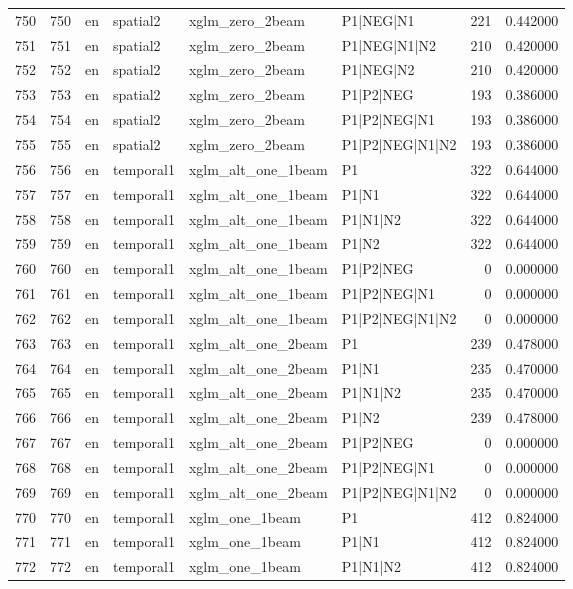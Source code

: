 \begin{tabular}{lrllllrr}
750 & 750 & en & spatial2 & xglm_zero_2beam & P1|NEG|N1 & 221 & 0.442000 \\
751 & 751 & en & spatial2 & xglm_zero_2beam & P1|NEG|N1|N2 & 210 & 0.420000 \\
752 & 752 & en & spatial2 & xglm_zero_2beam & P1|NEG|N2 & 210 & 0.420000 \\
753 & 753 & en & spatial2 & xglm_zero_2beam & P1|P2|NEG & 193 & 0.386000 \\
754 & 754 & en & spatial2 & xglm_zero_2beam & P1|P2|NEG|N1 & 193 & 0.386000 \\
755 & 755 & en & spatial2 & xglm_zero_2beam & P1|P2|NEG|N1|N2 & 193 & 0.386000 \\
756 & 756 & en & temporal1 & xglm_alt_one_1beam & P1 & 322 & 0.644000 \\
757 & 757 & en & temporal1 & xglm_alt_one_1beam & P1|N1 & 322 & 0.644000 \\
758 & 758 & en & temporal1 & xglm_alt_one_1beam & P1|N1|N2 & 322 & 0.644000 \\
759 & 759 & en & temporal1 & xglm_alt_one_1beam & P1|N2 & 322 & 0.644000 \\
760 & 760 & en & temporal1 & xglm_alt_one_1beam & P1|P2|NEG & 0 & 0.000000 \\
761 & 761 & en & temporal1 & xglm_alt_one_1beam & P1|P2|NEG|N1 & 0 & 0.000000 \\
762 & 762 & en & temporal1 & xglm_alt_one_1beam & P1|P2|NEG|N1|N2 & 0 & 0.000000 \\
763 & 763 & en & temporal1 & xglm_alt_one_2beam & P1 & 239 & 0.478000 \\
764 & 764 & en & temporal1 & xglm_alt_one_2beam & P1|N1 & 235 & 0.470000 \\
765 & 765 & en & temporal1 & xglm_alt_one_2beam & P1|N1|N2 & 235 & 0.470000 \\
766 & 766 & en & temporal1 & xglm_alt_one_2beam & P1|N2 & 239 & 0.478000 \\
767 & 767 & en & temporal1 & xglm_alt_one_2beam & P1|P2|NEG & 0 & 0.000000 \\
768 & 768 & en & temporal1 & xglm_alt_one_2beam & P1|P2|NEG|N1 & 0 & 0.000000 \\
769 & 769 & en & temporal1 & xglm_alt_one_2beam & P1|P2|NEG|N1|N2 & 0 & 0.000000 \\
770 & 770 & en & temporal1 & xglm_one_1beam & P1 & 412 & 0.824000 \\
771 & 771 & en & temporal1 & xglm_one_1beam & P1|N1 & 412 & 0.824000 \\
772 & 772 & en & temporal1 & xglm_one_1beam & P1|N1|N2 & 412 & 0.824000 \\

\end{tabular}
